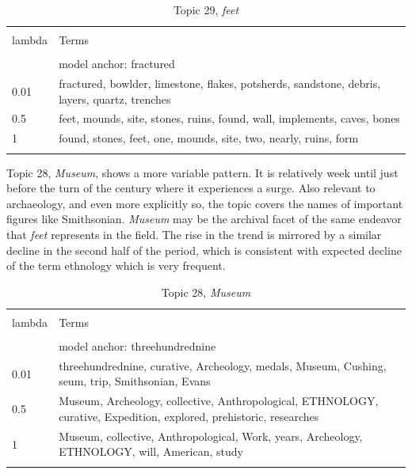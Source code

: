 \documentclass[]{book}
\theoremstyle{definition}
\theoremstyle{definition}
\theoremstyle{definition}
\theoremstyle{remark}
\begin{document}
\begin{table}[!htbp] \centering 
  \caption{Topic 29, \emph{feet}} 
  \label{tab:t29-a} 
\begin{tabularx}{\textwidth}{@{\extracolsep{5pt}} lY} 
\\[-1.8ex]\hline 
\hline \\[-1.8ex] 
lambda & Terms \\ 
\hline \\[-1.8ex] 
 & model anchor: fractured \\ 
0.01 & fractured, bowlder, limestone, flakes, potsherds, sandstone, debris, layers, quartz, trenches \\ 
0.5 & feet, mounds, site, stones, ruins, found, wall, implements, caves, bones \\ 
1 & found, stones, feet, one, mounds, site, two, nearly, ruins, form \\ 
\hline \\[-1.8ex] 
\end{tabularx} 
\end{table}

Topic 28, \emph{Museum}, shows a more variable pattern. It is relatively
week until just before the turn of the century where it experiences a
surge. Also relevant to archaeology, and even more explicitly so, the
topic covers the names of important figures like Smithsonian.
\emph{Museum} may be the archival facet of the same endeavor that
\emph{feet} represents in the field. The rise in the trend is mirrored
by a similar decline in the second half of the period, which is
consistent with expected decline of the term ethnology which is very
frequent.



\begin{table}[!htbp] \centering 
  \caption{Topic 28, \emph{Museum}} 
  \label{tab:t28-a} 
\begin{tabularx}{\textwidth}{@{\extracolsep{5pt}} lY} 
\\[-1.8ex]\hline 
\hline \\[-1.8ex] 
lambda & Terms \\ 
\hline \\[-1.8ex] 
 & model anchor: threehundrednine \\ 
0.01 & threehundrednine, curative, Archeology, medals, Museum, Cushing, seum, trip, Smithsonian, Evans \\ 
0.5 & Museum, Archeology, collective, Anthropological, ETHNOLOGY, curative, Expedition, explored, prehistoric, researches \\ 
1 & Museum, collective, Anthropological, Work, years, Archeology, ETHNOLOGY, will, American, study \\ 
\hline \\[-1.8ex] 
\end{tabularx} 
\end{table}
\end{document}
